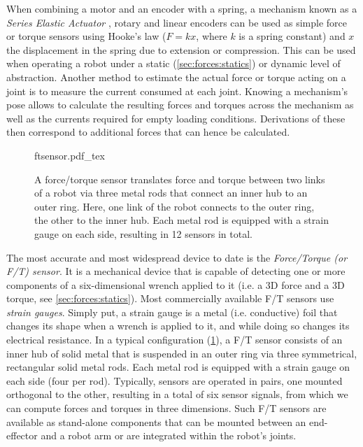 When combining a motor and an encoder with a spring, a mechanism known as  a \textsl{Series Elastic Actuator}\cite{pratt1995series} , rotary and linear encoders can be used as simple force or torque sensors using Hooke's law ($F=kx$, where $k$ is a spring constant) and $x$ the displacement in the spring due to extension or compression.
This can be used when operating a robot under a static (\cref{sec:forces:statics}) or dynamic level of abstraction.
Another method to estimate the actual force or torque acting on a joint is to measure the current consumed at each joint. Knowing a mechanism's pose allows to calculate the resulting forces and torques across the mechanism as well as the currents required for empty loading conditions. Derivations of these then correspond to additional forces that can hence be calculated.


\begin{figure}
	\centering
	\def\svgwidth{0.9\textwidth}
    {ftsensor.pdf_tex}
	\caption{A force/torque sensor translates force and torque between two links of a robot via three metal rods that connect an inner hub to an outer ring. Here, one link of the robot connects to the outer ring, the other to the inner hub.  Each metal rod is equipped with a strain gauge on each side, resulting in 12 sensors in total. 
	\label{fig:ftsensor}}
\end{figure}


The most accurate and most widespread device to date is the \textsl{Force/Torque (or F/T) sensor}. It is a mechanical device that is capable of detecting one or more components of a six-dimensional wrench applied to it (i.e. a 3D force and a 3D torque, see \cref{sec:forces:statics}).
Most commercially available F/T sensors use  \textsl{strain gauges}. Simply put, a strain gauge is a metal (i.e. conductive) foil that changes its shape when a wrench is applied to it, and while doing so changes its electrical resistance. In a typical configuration (\cref{fig:ftsensor}), a F/T sensor consists of an inner hub of solid metal that is suspended in an outer ring via three symmetrical, rectangular solid metal rods. Each metal rod is equipped with a strain gauge on each side (four per rod). Typically, sensors are operated in pairs, one mounted orthogonal to the other, resulting in a total of six sensor signals, from which we can compute forces and torques in three dimensions. Such F/T sensors are available as stand-alone components that can be mounted between an end-effector and a robot arm or are integrated within the robot's joints. 

